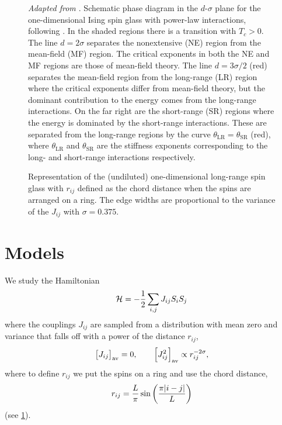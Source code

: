 \begin{figure}
  \centering
  
  \caption[
    Schematic phase diagram of the one-dimensional Ising spin glass with
    power-law interactions.
  ]
  {
    \emph{Adapted from \textcite{katzgraber2003monte}}.
    Schematic phase diagram in the $d$-$\sigma$ plane for the one-dimensional
    Ising spin glass with power-law interactions, following
    \textcite{fisher1988equilibrium}. In the shaded regions there is a
    transition with $T_c>0$. The line $d=2\sigma$ separates the nonextensive
    (NE) region from the mean-field (MF) region. The critical exponents in both
    the NE and MF regions are those of mean-field theory. The line
    $d=3\sigma/2$ (red) separates the mean-field region from the long-range
    (LR) region where the critical exponents differ from mean-field theory, but
    the dominant contribution to the energy comes from the long-range
    interactions. On the far right are the short-range (SR) regions where the
    energy is dominated by the short-range interactions. These are separated
    from the long-range regions by the curve
    $\theta_{\mathrm{LR}}=\theta_{\mathrm{SR}}$ (red), where
    $\theta_{\mathrm{LR}}$ and $\theta_{\mathrm{SR}}$ are the stiffness
    exponents corresponding to the long- and short-range interactions
    respectively.
  }
\end{figure}

\begin{figure}
  \centering
  
  \caption[
    Representation of the one-dimensional long-range Ising spin glass
    with periodic boundary conditions.
  ]
  {
    Representation of the (undiluted) one-dimensional long-range spin glass
    with $r_{ij}$ defined as the chord distance when the spins are arranged on
    a ring. The edge widths are proportional to the variance of the $J_{ij}$
    with $\sigma=0.375$.
  } \label{fig:1dlr-chord}
\end{figure}


\section{Models}
\label{sec:nonextensive-models}

We study the Hamiltonian
\begin{equation}
    \mathcal{H} = -\frac{1}{2} \sum_{i,j} J_{ij} S_i S_j
\end{equation}
where the couplings $J_{ij}$ are sampled from a distribution with mean zero and
variance that falls off with a power of the distance $r_{ij}$,
\begin{equation}
  \left[J_{ij}\right]_{\mathrm{av}} = 0,
  \qquad
  \left[J_{ij}^2\right]_{\mathrm{av}} \propto r_{ij}^{-2\sigma},
  \label{eq:J-mean-variance-lr}
\end{equation}
where to define $r_{ij}$ we put the spins on a ring and use the chord distance,
\begin{equation}
  r_{ij} = \frac{L}{\pi} \sin\left(\frac{\pi\abs{i-j}}{L}\right)
  \label{eq:chord-distance}
\end{equation}
(see \cref{fig:1dlr-chord}).

